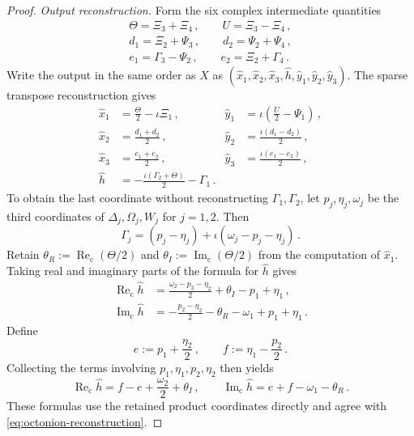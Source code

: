 \documentclass[11pt,reqno]{amsart}
\numberwithin{equation}{section}
\newcommand{\ReC}{\operatorname{Re}_{\mathrm c}}
\newcommand{\ImC}{\operatorname{Im}_{\mathrm c}}
\begin{document}
\begin{proof}
\emph{Output reconstruction.} Form the six complex intermediate
quantities
\[
\begin{gathered}
\Theta=\Xi_3+\Xi_4\,,\qquad U=\Xi_3-\Xi_4\,,\\
d_1=\Xi_2+\Psi_3\,,\qquad d_2=\Psi_2+\Psi_4\,,\\
e_1=\Gamma_3-\Psi_2\,,\qquad e_2=\Xi_2+\Gamma_4\,.
\end{gathered}
\]
Write the output in the same order as $X$ as
$(\widehat x_1,\widehat x_2,\widehat x_3,\widehat h,
\widehat y_1,\widehat y_2,\widehat y_3)$. The sparse transpose
reconstruction gives
\begin{equation}\label{eq:octonion-reconstruction}
\begin{aligned}
\widehat x_1&=\frac{\Theta}{2}-\iota \Xi_1\,,
&\widehat y_1&=\iota\left(\frac{U}{2}-\Psi_1\right)\,,\\
\widehat x_2&=\frac{d_1+d_2}{2}\,,
&\widehat y_2&=\frac{\iota(d_1-d_2)}{2}\,,\\
\widehat x_3&=\frac{e_1+e_2}{2}\,,
&\widehat y_3&=\frac{\iota(e_1-e_2)}{2}\,,\\
\widehat h&=-\frac{\iota(\Gamma_2+\Theta)}{2}-\Gamma_1\,.
\end{aligned}
\end{equation}
To obtain the last coordinate without reconstructing $\Gamma_1,\Gamma_2$,
let $p_j,\eta_j,\omega_j$ be the third coordinates of
$\Delta_j,\Omega_j,W_j$ for $j=1,2$. Then
\[
\Gamma_j=(p_j-\eta_j)+\iota(\omega_j-p_j-\eta_j)\,.
\]
Retain $\theta_R:=\ReC(\Theta/2)$ and
$\theta_I:=\ImC(\Theta/2)$ from the computation of $\widehat x_1$.
Taking real and imaginary parts of the formula for $\widehat h$ gives
\[
\begin{aligned}
\ReC\widehat h
&=\frac{\omega_2-p_2-\eta_2}{2}+\theta_I-p_1+\eta_1\,,\\
\ImC\widehat h
&=-\frac{p_2-\eta_2}{2}-\theta_R-\omega_1+p_1+\eta_1\,.
\end{aligned}
\]
Define
\[
e:=p_1+\frac{\eta_2}{2}\,,\qquad f:=\eta_1-\frac{p_2}{2}\,.
\]
Collecting the terms involving $p_1,\eta_1,p_2,\eta_2$ then yields
\[
\ReC\widehat h=f-e+\frac{\omega_2}{2}+\theta_I\,,\qquad
\ImC\widehat h=e+f-\omega_1-\theta_R\,.
\]
These formulas use the retained product coordinates directly and agree
with \eqref{eq:octonion-reconstruction}.


\end{proof}
\end{document}
